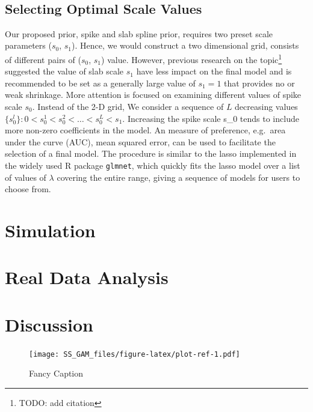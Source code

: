\documentclass[AMA,STIX1COL,]{WileyNJD-v2}
\begin{document}
~

\hypertarget{selecting-optimal-scale-values}{%
\subsection{Selecting Optimal Scale
Values}\label{selecting-optimal-scale-values}}

Our proposed prior, spike and slab spline prior, requires two preset
scale parameters (\(s_0\), \(s_1\)). Hence, we would construct a two
dimensional grid, consists of different pairs of (\(s_0\), \(s_1\))
value. However, previous research on the topic\footnote{TODO: add
  citation} suggested the value of slab scale \(s_1\) have less impact
on the final model and is recommended to be set as a generally large
value of \(s_1 = 1\) that provides no or weak shrinkage. More attention
is focused on examining different values of spike scale \(s_0\). Instead
of the 2-D grid, We consider a sequence of \(L\) decreasing values
\(\{s_0^l\}: 0 < s_0^1 < s_0^2 < \dots < s_0^L < s_1\). Increasing the
spike scale s\_0 tends to include more non-zero coefficients in the
model. An measure of preference, e.g.~area under the curve (AUC), mean
squared error, can be used to facilitate the selection of a final model.
The procedure is similar to the lasso implemented in the widely used R
package \texttt{glmnet}, which quickly fits the lasso model over a list
of values of \(\lambda\) covering the entire range, giving a sequence of
models for users to choose from.

\hypertarget{simulation}{%
\section{Simulation}\label{simulation}}

\hypertarget{real-data-analysis}{%
\section{Real Data Analysis}\label{real-data-analysis}}

\hypertarget{discussion}{%
\section{Discussion}\label{discussion}}

\begin{figure}
\centering
\texttt{[image: SS\_GAM\_files/figure-latex/plot-ref-1.pdf]}
\caption{Fancy Caption\label{fig:plot}}
\end{figure}
\end{document}
